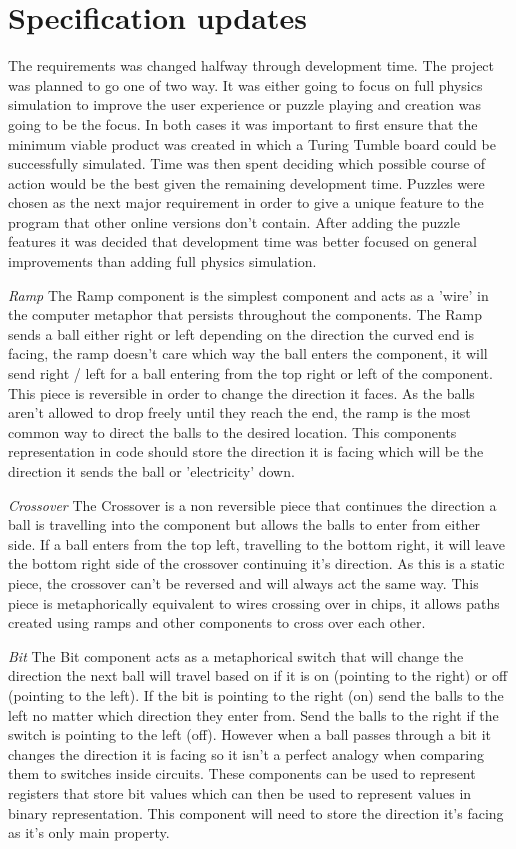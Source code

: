 \documentclass{l4proj}
\begin{document}
\section{Specification updates}
The requirements was changed halfway through development time. The project was planned to go one of two way. It was either going to focus on full physics simulation to improve the user experience or puzzle playing and creation was going to be the focus. In both cases it was important to first ensure that the minimum viable product was created in which a Turing Tumble board could be successfully simulated. Time was then spent deciding which possible course of action would be the best given the remaining development time. Puzzles were chosen as the next major requirement in order to give a unique feature to the program that other online versions don't contain. After adding the puzzle features it was decided that development time was better focused on general improvements than adding full physics simulation. 


\emph{Ramp} 
The Ramp component is the simplest component and acts as a 'wire' in the computer metaphor that persists throughout the components. 
The Ramp sends a ball either right or left depending on the direction the curved end is facing, the ramp doesn't care which way the ball enters
the component, it will send right / left for a ball entering from the top right or left of the component. This piece is reversible in order to change the direction
it faces. As the balls aren't allowed to drop freely until they reach the end, the ramp is the most common way to direct the balls to the desired location.
This components representation in code should store the direction it is facing which will be the direction it sends the ball or 'electricity' down.

\emph{Crossover}
The Crossover is a non reversible piece that continues the direction a ball is travelling into the component but allows the balls to enter from either side.
If a ball enters from the top left, travelling to the bottom right, it will leave the bottom right side of the crossover continuing it's direction. As this is a 
static piece, the crossover can't be reversed and will always act the same way. This piece is metaphorically equivalent to wires crossing over in chips, it allows paths created 
using ramps and other components to cross over each other.

\emph{Bit}
The Bit component acts as a metaphorical switch that will change the direction the next ball will travel based on if it is on (pointing to the right) or off (pointing to the left).
If the bit is pointing to the right (on) send the balls to the left no matter which direction they enter from. Send the balls to the right if the switch is pointing to the left (off).
However when a ball passes through a bit it changes the direction it is facing so it isn't a perfect analogy when comparing them to switches inside circuits. These components can be used to represent registers
that store bit values which can then be used to represent values in binary representation.
This component will need to store the direction it's facing as it's only main property.
\end{document}
